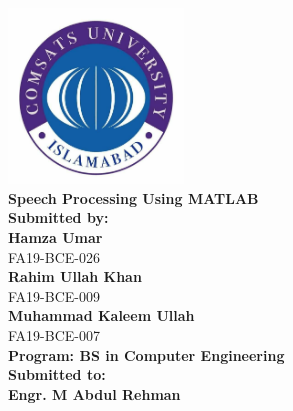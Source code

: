 
\begin{titlepage}
\begin{center}


\includegraphics[width=0.35\textwidth]{./logo}~\\[1.5cm]


{ \huge \bfseries Speech Processing Using MATLAB} \\[1.4cm]

{ \large \bfseries Submitted by:} \\[0.2cm]
{ \large \bfseries Hamza Umar}  \\[0.1cm]
{ \small FA19-BCE-026} \\[0.2cm]
{ \large \bfseries Rahim Ullah Khan}  \\[0.1cm]
{ \small FA19-BCE-009} \\[0.2cm]
{ \large \bfseries Muhammad Kaleem Ullah}  \\[0.1cm]
{ \small FA19-BCE-007} \\[0.2cm]



{ \small \bfseries Program: BS in Computer Engineering} \\[0.2cm]


{ \large \bfseries Submitted to:} \\[0.1cm]
{ \small \bfseries  Engr. M Abdul Rehman} \\[1.0cm]




\end{center}
\end{titlepage}
